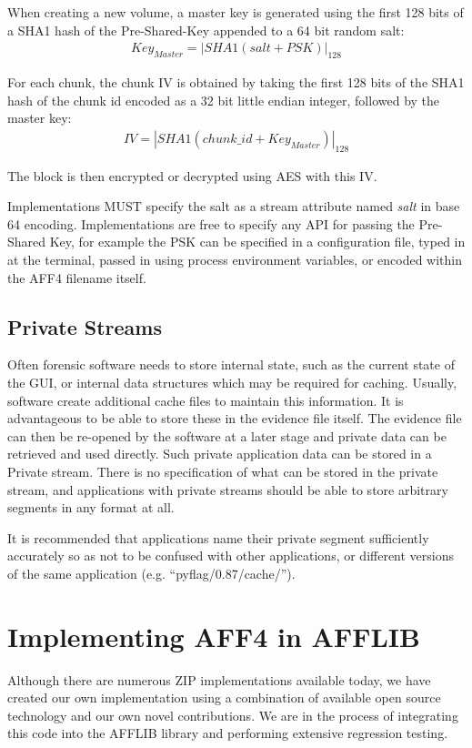 \documentclass[10pt, conference]{IEEEtran}
\begin{document}
When creating a new volume, a master key is generated using the first
128 bits of a SHA1 hash of the Pre-Shared-Key appended to a 64 bit
random salt:
\begin{eqnarray}
Key_{Master} = \left | SHA1(salt + PSK) \right | _{128}
\end{eqnarray}

For each chunk, the chunk IV is obtained by taking the first 128 bits
of the SHA1 hash of the chunk id encoded as a 32 bit little endian
integer, followed by the master key:
\begin{eqnarray}
IV = \left | SHA1(chunk\_id + Key_{Master}) \right | _{128}
\end{eqnarray}

The block is then encrypted or decrypted using AES with this IV.

Implementations MUST specify the salt as a stream attribute named {\em
salt} in base 64 encoding. Implementations are free to specify any API
for passing the Pre-Shared Key, for example the PSK can be specified
in a configuration file, typed in at the terminal, passed in using
process environment variables, or encoded within the AFF4 filename
itself.

\subsection{Private Streams}
Often forensic software needs to store internal state, such as the
current state of the GUI, or internal data structures which may be
required for caching. Usually, software create additional cache files
to maintain this information. It is advantageous to be able to store
these in the evidence file itself. The evidence file can then be
re-opened by the software at a later stage and private data can be
retrieved and used directly. Such private application data can be
stored in a Private stream. There is no specification of what can be
stored in the private stream, and applications with private streams
should be able to store arbitrary segments in any format at all.

It is recommended that applications name their private segment
sufficiently accurately so as not to be confused with other
applications, or different versions of the same application
(e.g. ``pyflag/0.87/cache/'').



\section{Implementing AFF4 in AFFLIB}
Although there are numerous ZIP implementations available
today, we have created our own implementation using a combination of
available open source technology and our own novel contributions. We
are in the process of integrating this code into the AFFLIB library
and performing extensive regression testing. 
\end{document}
